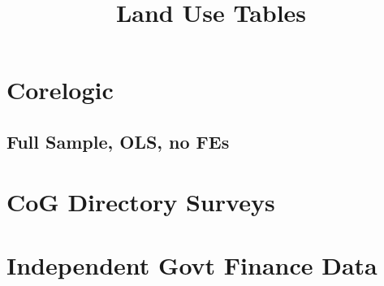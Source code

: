 \documentclass{article}
\title{Land Use Tables}
\begin{document}
\maketitle
\tableofcontents
{\footnotesize 
\listoffigures
\listoftables}
\clearpage

\section{Corelogic}
\begin{landscape}

\subsection{Full Sample, OLS, no FEs}

\clearpage

\clearpage

\section{CoG Directory Surveys}

\clearpage

\clearpage

\section{Independent Govt Finance Data}

\clearpage

\clearpage

\end{landscape}
\end{document}
